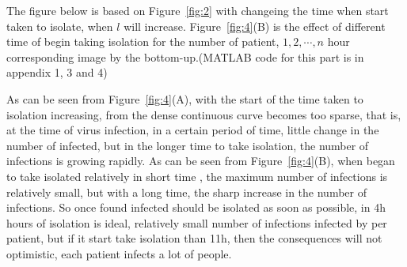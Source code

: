 The figure below is based on Figure~\ref{fig:2} with changeing
the time when start taken to isolate, when $l$ will increase.
Figure~\ref{fig:4}(B) is the effect of different time of begin taking 
isolation for the number of patient, $1,2,\cdots,n$ hour
corresponding image by the bottom-up.(MATLAB code for this part
is in appendix 1, 3 and 4)\par
As can be seen from Figure~\ref{fig:4}(A), with the start of
the time taken to isolation increasing, from the dense
continuous curve becomes too sparse, that is, at the time of
virus infection, in a certain period of time, little change in
the number of infected, but in the longer time to take
isolation, the number of infections is growing rapidly.
As can be seen from Figure~\ref{fig:4}(B), when began to take
isolated relatively in short time , the maximum number of
infections is relatively small, but with a long time, the sharp
increase in the number of infections. So once found infected
should be isolated as soon as possible, in 4h hours of isolation
is ideal, relatively small number of infections infected by per
patient, but if it start take isolation than 11h, then the
consequences will not optimistic, each patient infects
a lot of people.



